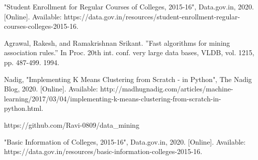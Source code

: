 \begin{thebibliography}{00}

 "Student Enrollment for Regular Courses of Colleges, 2015-16", Data.gov.in, 2020. [Online]. Available: https://data.gov.in/resources/student-enrollment-regular-courses-colleges-2015-16.

 Agrawal, Rakesh, and Ramakrishnan Srikant. ”Fast algorithms for mining association rules.” In Proc. 20th int. conf. very large data bases, VLDB, vol. 1215, pp. 487-499. 1994.

 Nadig, "Implementing K Means Clustering from Scratch - in Python", The Nadig Blog, 2020. [Online]. Available: http://madhugnadig.com/articles/machine-learning/2017/03/04/implementing-k-means-clustering-from-scratch-in-python.html.

 https://github.com/Ravi-0809/data\_mining

 "Basic Information of Colleges, 2015-16", Data.gov.in, 2020. [Online]. Available: https://data.gov.in/resources/basic-information-colleges-2015-16.

\end{thebibliography}
